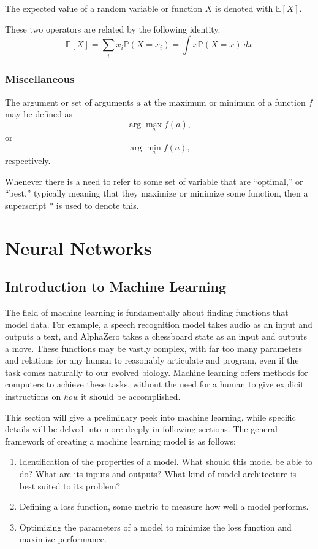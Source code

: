 \documentclass[12pt]{report}
\theoremstyle{definition}
\theoremstyle{remark}
\begin{document}
The expected value of a random variable or function $X$ is denoted with $\mathbb{E}[X]$.

These two operators are related by the following identity.
\begin{equation}
    \mathbb{E}[X] = \sum_i x_i \mathbb{P}(X=x_i) = \int x\mathbb{P}(X=x)\ dx
\end{equation}

\subsection{Miscellaneous}
The argument or set of arguments $a$ at the maximum or minimum of a function $f$ may be defined as
\begin{equation}
    \arg\max_a f(a),
\end{equation}
or
\begin{equation}
    \arg\min_a f(a),
\end{equation}
respectively.

Whenever there is a need to refer to some set of variable that are ``optimal,'' or ``best,'' typically meaning that they maximize or minimize some function, then a superscript $\ast$ is used to denote this.


\chapter{Neural Networks}
\section{Introduction to Machine Learning}
The field of machine learning is fundamentally about finding functions that model data. For example, a speech recognition model takes audio as an input and outputs a text, and AlphaZero takes a chessboard state as an input and outputs a move. These functions may be vastly complex, with far too many parameters and relations for any human to reasonably articulate and program, even if the task comes naturally to our evolved biology. Machine learning offers methods for computers to achieve these tasks, without the need for a human to give explicit instructions on \textit{how} it should be accomplished.

This section will give a preliminary peek into machine learning, while specific details will be delved into more deeply in following sections. The general framework of creating a machine learning model is as follows:

\begin{enumerate}
    \item Identification of the properties of a model. What should this model be able to do? What are its inputs and outputs? What kind of model architecture is best suited to its problem?
    \item Defining a loss function, some metric to measure how well a model performs.
    \item Optimizing the parameters of a model to minimize the loss function and maximize performance.
\end{enumerate}
\end{document}
